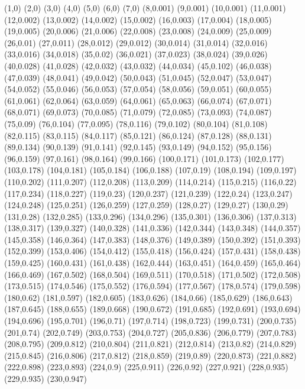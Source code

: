 (1,0)
(2,0)
(3,0)
(4,0)
(5,0)
(6,0)
(7,0)
(8,0.001)
(9,0.001)
(10,0.001)
(11,0.001)
(12,0.002)
(13,0.002)
(14,0.002)
(15,0.002)
(16,0.003)
(17,0.004)
(18,0.005)
(19,0.005)
(20,0.006)
(21,0.006)
(22,0.008)
(23,0.008)
(24,0.009)
(25,0.009)
(26,0.01)
(27,0.011)
(28,0.012)
(29,0.012)
(30,0.014)
(31,0.014)
(32,0.016)
(33,0.016)
(34,0.018)
(35,0.02)
(36,0.021)
(37,0.023)
(38,0.024)
(39,0.026)
(40,0.028)
(41,0.028)
(42,0.032)
(43,0.032)
(44,0.034)
(45,0.102)
(46,0.038)
(47,0.039)
(48,0.041)
(49,0.042)
(50,0.043)
(51,0.045)
(52,0.047)
(53,0.047)
(54,0.052)
(55,0.046)
(56,0.053)
(57,0.054)
(58,0.056)
(59,0.051)
(60,0.055)
(61,0.061)
(62,0.064)
(63,0.059)
(64,0.061)
(65,0.063)
(66,0.074)
(67,0.071)
(68,0.071)
(69,0.073)
(70,0.085)
(71,0.079)
(72,0.085)
(73,0.093)
(74,0.087)
(75,0.09)
(76,0.104)
(77,0.095)
(78,0.116)
(79,0.102)
(80,0.104)
(81,0.108)
(82,0.115)
(83,0.115)
(84,0.117)
(85,0.121)
(86,0.124)
(87,0.128)
(88,0.131)
(89,0.134)
(90,0.139)
(91,0.141)
(92,0.145)
(93,0.149)
(94,0.152)
(95,0.156)
(96,0.159)
(97,0.161)
(98,0.164)
(99,0.166)
(100,0.171)
(101,0.173)
(102,0.177)
(103,0.178)
(104,0.181)
(105,0.184)
(106,0.188)
(107,0.19)
(108,0.194)
(109,0.197)
(110,0.202)
(111,0.207)
(112,0.208)
(113,0.209)
(114,0.214)
(115,0.215)
(116,0.22)
(117,0.234)
(118,0.227)
(119,0.23)
(120,0.237)
(121,0.239)
(122,0.24)
(123,0.247)
(124,0.248)
(125,0.251)
(126,0.259)
(127,0.259)
(128,0.27)
(129,0.27)
(130,0.29)
(131,0.28)
(132,0.285)
(133,0.296)
(134,0.296)
(135,0.301)
(136,0.306)
(137,0.313)
(138,0.317)
(139,0.327)
(140,0.328)
(141,0.336)
(142,0.344)
(143,0.348)
(144,0.357)
(145,0.358)
(146,0.364)
(147,0.383)
(148,0.376)
(149,0.389)
(150,0.392)
(151,0.393)
(152,0.399)
(153,0.406)
(154,0.412)
(155,0.418)
(156,0.424)
(157,0.431)
(158,0.438)
(159,0.425)
(160,0.431)
(161,0.438)
(162,0.444)
(163,0.451)
(164,0.459)
(165,0.464)
(166,0.469)
(167,0.502)
(168,0.504)
(169,0.511)
(170,0.518)
(171,0.502)
(172,0.508)
(173,0.515)
(174,0.546)
(175,0.552)
(176,0.594)
(177,0.567)
(178,0.574)
(179,0.598)
(180,0.62)
(181,0.597)
(182,0.605)
(183,0.626)
(184,0.66)
(185,0.629)
(186,0.643)
(187,0.645)
(188,0.655)
(189,0.668)
(190,0.672)
(191,0.685)
(192,0.691)
(193,0.694)
(194,0.696)
(195,0.701)
(196,0.71)
(197,0.714)
(198,0.723)
(199,0.731)
(200,0.735)
(201,0.74)
(202,0.749)
(203,0.753)
(204,0.727)
(205,0.836)
(206,0.779)
(207,0.783)
(208,0.795)
(209,0.812)
(210,0.804)
(211,0.821)
(212,0.814)
(213,0.82)
(214,0.829)
(215,0.845)
(216,0.806)
(217,0.812)
(218,0.859)
(219,0.89)
(220,0.873)
(221,0.882)
(222,0.898)
(223,0.893)
(224,0.9)
(225,0.911)
(226,0.92)
(227,0.921)
(228,0.935)
(229,0.935)
(230,0.947)
